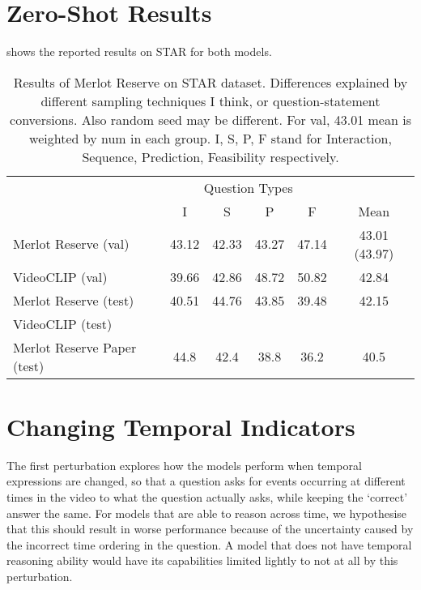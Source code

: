 \section{Zero-Shot Results}
\label{sec:zs_star}

 shows the reported results on STAR for both models.

\begin{table}[tp] 
    \centering 
    \caption{Results of Merlot Reserve on STAR dataset. Differences explained
        by different sampling techniques I think, or question-statement
        conversions. Also random seed may be different. For val, 43.01 mean is
        weighted by num in each group. I, S, P, F stand for Interaction,
        Sequence, Prediction, Feasibility respectively.}
    \label{tab:zs_star} 
    \begin{tabular}{lccccc} 
        \toprule
        \multicolumn{1}{c}{}        & \multicolumn{4}{c}{Question Types}                & \multicolumn{1}{c}{} \\
                                      \cmidrule(){2-5}
                                    & I & S & P & F & Mean \\
        \cmidrule(r){1-1}             \cmidrule(){2-5}                                    \cmidrule(l){6-6}
        Merlot Reserve (val)        & 43.12       & 42.33    & 43.27      & 47.14       & 43.01 (43.97) \\
        VideoCLIP (val)             & 39.66       & 42.86    & 48.72      & 50.82       & 42.84 \\
        Merlot Reserve (test)       & 40.51       & 44.76    & 43.85      & 39.48       & 42.15 \\  
        VideoCLIP (test)            &        &     &       &        &  \\
        \cmidrule(r){1-1}             \cmidrule(){2-5}                                    \cmidrule(l){6-6}
        Merlot Reserve Paper (test) & 44.8        & 42.4     & 38.8       & 36.2        & 40.5 \\
        \bottomrule
    \end{tabular} 
\end{table} 


\section{Changing Temporal Indicators}
\label{sec:change_temp}

The first perturbation explores how the models perform when temporal
expressions are changed, so that a question asks for events occurring at
different times in the video to what the question actually asks, while keeping
the `correct' answer the same. For models that are able to reason across time,
we hypothesise that this should result in worse performance because of the
uncertainty caused by the incorrect time ordering in the question. A model that
does not have temporal reasoning ability would have its capabilities limited
lightly to not at all by this perturbation.

